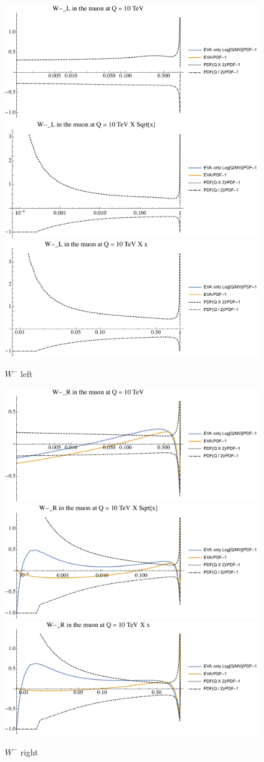 \documentclass[a4paper,11pt]{article}
\begin{document}
\begin{figure}[!b]
\includegraphics[width=0.46\linewidth]{Notebooks/PlotPDFs/ratios/10TeV/W-_L_Q.pdf}
\includegraphics[width=0.46\linewidth]{Notebooks/PlotPDFs/ratios/10TeV/W-_L_Qsqrtx.pdf}
\includegraphics[width=0.46\linewidth]{Notebooks/PlotPDFs/ratios/10TeV/W-_L_Qx.pdf}
\caption{$W^-$ left}
\end{figure}

\begin{figure}[!b]
\includegraphics[width=0.46\linewidth]{Notebooks/PlotPDFs/ratios/10TeV/W-_R_Q.pdf}
\includegraphics[width=0.46\linewidth]{Notebooks/PlotPDFs/ratios/10TeV/W-_R_Qsqrtx.pdf}
\includegraphics[width=0.46\linewidth]{Notebooks/PlotPDFs/ratios/10TeV/W-_R_Qx.pdf}
\caption{$W^-$ right}
\end{figure}
\end{document}
